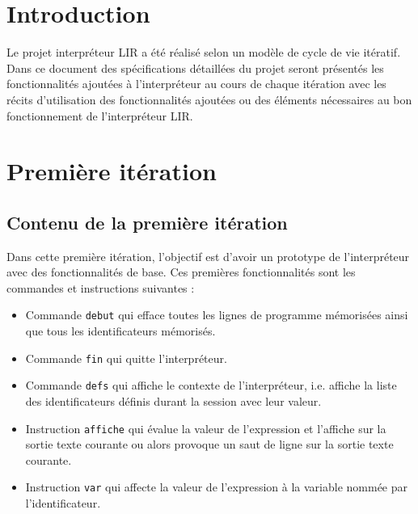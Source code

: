 \documentclass[12pt,a4paper,titlepage,openany, oneside]{report}
\begin{document}
    \renewcommand\rmdefault{pag}
    \selectfont
    \renewcommand{\sfdefault}{pag}

    \renewcommand{\contentsname}{Sommaire}
    \tableofcontents

    \chapter*{Introduction}
    \Large
    Le projet interpréteur LIR a été réalisé selon un modèle de cycle
    de vie itératif. Dans ce document des spécifications détaillées du
    projet seront présentés les fonctionnalités ajoutées à l'interpréteur
    au cours de chaque itération avec les récits d'utilisation des
    fonctionnalités ajoutées ou des éléments nécessaires au bon
    fonctionnement de l'interpréteur LIR.


    \large
    \chapter{Première itération}

    \section*{Contenu de la première itération}
    Dans cette première itération, l'objectif est d'avoir un
    prototype de l'interpréteur avec des fonctionnalités de base.
    Ces premières fonctionnalités sont les commandes et instructions suivantes :
    \begin{itemize}
        \item Commande \verb|debut| qui efface toutes les lignes de
              programme mémorisées ainsi que tous les identificateurs
              mémorisés.
        \item Commande \verb|fin| qui quitte l'interpréteur.
        \item Commande \verb|defs| qui affiche le contexte de
              l'interpréteur, i.e. affiche la liste des identificateurs
              définis durant la session avec leur valeur.
        \item Instruction \verb|affiche| qui évalue la valeur de
              l'expression et l'affiche sur la sortie texte courante ou
              alors provoque un saut de ligne sur la sortie texte
              courante.
        \item Instruction \verb|var| qui affecte la valeur de
              l'expression à la variable nommée par l’identificateur.
    \end{itemize}
\end{document}
